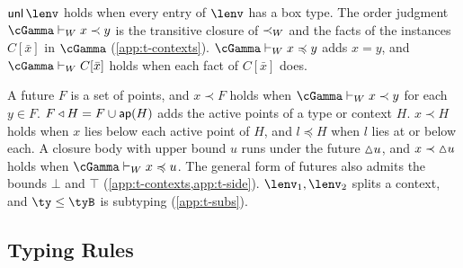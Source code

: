 \begin{definition}
\label{def:side}
$\unl\,\lenv$ holds when every entry of $\lenv$ has a box type. The order judgment $\cGamma \vdash_W x \prec y$ is the transitive closure of $\prec_{W}$ and the facts of the instances $C[\bar x]$ in $\cGamma$ (\cref{app:t-contexts}). $\cGamma \vdash_W x \preccurlyeq y$ adds $x = y$, and $\cGamma \vdash_W C[\bar x]$ holds when each fact of $C[\bar x]$ does.

A future $F$ is a set of points, and $x \prec F$ holds when $\cGamma \vdash_W x \prec y$ for each $y \in F$. $F \triangleleft H = F \cup \mathsf{ap}(H)$ adds the active points of a type or context $H$. $x \prec H$ holds when $x$ lies below each active point of $H$, and $l \preccurlyeq H$ when $l$ lies at or below each. A closure body with upper bound $u$ runs under the future ${\vartriangle}u$, and $x \prec {\vartriangle}u$ holds when $\cGamma \vdash_W x \preccurlyeq u$. The general form of futures also admits the bounds $\bot$ and $\top$ (\cref{app:t-contexts,app:t-side}). $\lenv_1, \lenv_2$ splits a context, and $\ty \leq \tyB$ is subtyping (\cref{app:t-subs}).
\end{definition}

\subsection{Typing Rules}
\label{sec:rules}



